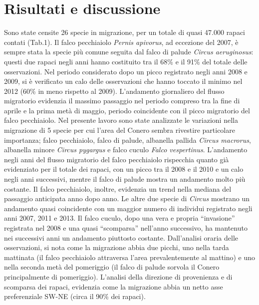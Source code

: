 \section*{Risultati e discussione}

Sono state censite 26 specie in migrazione, per un totale di quasi
47.000 rapaci contati (Tab.1). Il falco pecchiaiolo \textit{Pernis
apivorus}, ad eccezione del 2007, \`e sempre stata la specie pi\`u
comune seguita dal falco di palude \textit{Circus aeruginosus}: questi
due rapaci negli anni hanno costituito tra il 68\% e il 91\% del totale
delle osservazioni. Nel periodo considerato dopo un picco registrato
negli anni 2008 e 2009, si \`e verificato un calo delle osservazioni
che hanno toccato il minimo nel 2012 (60\% in meno rispetto al 2009).
L{\textquoteright}andamento giornaliero del flusso migratorio evidenzia
il massimo passaggio nel periodo compreso tra la fine di aprile e la
prima met\`a di maggio, periodo coincidente con il picco migratorio del
falco pecchiaiolo. Nel presente lavoro sono state analizzate le
variazioni nella migrazione di 5 specie per cui l{\textquoteright}area
del Conero sembra rivestire particolare importanza; falco pecchiaiolo,
falco di palude, albanella pallida \textit{Circus macrorus}, albanella
minore \textit{Circus pygargus} e falco cuculo \textit{Falco
vespertinus}. L{\textquoteright}andamento negli anni del flusso
migratorio del falco pecchiaiolo rispecchia quanto gi\`a evidenziato
per il totale dei rapaci, con un picco tra il 2008 e il 2010 e un calo
negli anni successivi, mentre il falco di palude mostra un andamento
molto pi\`u costante. Il falco pecchiaiolo, inoltre, evidenzia un trend
nella mediana del passaggio anticipata anno dopo anno. Le altre due
specie di \textit{Circus} mostrano un andamento quasi coincidente con
un maggior numero di individui registrato negli anni 2007, 2011 e 2013.
Il falco cuculo, dopo una vera e propria
{\textquotedblleft}invasione{\textquotedblright} registrata nel 2008 e
una quasi {\textquotedblleft}scomparsa{\textquotedblright}
nell{\textquoteright}anno successivo, ha mantenuto nei successivi anni
un andamento piuttosto costante. Dall{\textquoteright}analisi oraria
delle osservazioni, si nota come la migrazione abbia due picchi, uno
nella tarda mattinata (il falco pecchiaiolo attraversa
l{\textquoteright}area prevalentemente al mattino) e uno nella seconda
met\`a del pomeriggio (il falco di palude sorvola il Conero
principalmente di pomeriggio). L{\textquoteright}analisi della
direzione di provenienza e di scomparsa dei rapaci, evidenzia come la
migrazione abbia un netto asse preferenziale SW-NE (circa il 90\% dei
rapaci).

